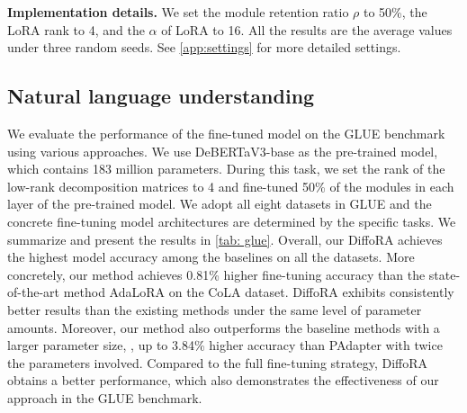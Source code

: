 \noindent\textbf{Implementation details.}
We set the module retention ratio $\rho$ to 50\%, the LoRA rank to 4, and the $\alpha$ of LoRA to 16. All the results are the average values under three random seeds. See \cref{app:settings} for more detailed settings. 



\subsection{Natural language understanding}
We evaluate the performance of the fine-tuned model on the GLUE benchmark \cite{wang2018glue} using various approaches.
We use DeBERTaV3-base as the pre-trained model, which contains 183 million parameters. 
%
During this task, we set the rank of the low-rank decomposition matrices to 4 and fine-tuned 50\% of the modules in each layer of the pre-trained model.
%
We adopt all eight datasets in GLUE and the concrete fine-tuning model architectures are determined by the specific tasks. 
%
We summarize and present the results in \cref{tab: glue}.
Overall, our DiffoRA achieves the highest model accuracy among the baselines on all the datasets.
More concretely, our method achieves 0.81\% higher fine-tuning accuracy than the state-of-the-art method AdaLoRA on the CoLA dataset.
DiffoRA exhibits consistently better results than the existing methods under the same level of parameter amounts. 
Moreover, our method also outperforms the baseline methods with a larger parameter size, \ie, up to 3.84\% higher accuracy than PAdapter with twice the parameters involved. 
Compared to the full fine-tuning strategy, DiffoRA obtains a better performance, which also demonstrates the effectiveness of our approach in the GLUE benchmark. 


